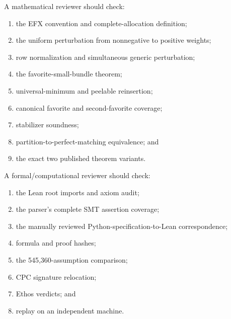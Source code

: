 \documentclass[11pt]{article}
\theoremstyle{definition}
\begin{document}
A mathematical reviewer should check:
\begin{enumerate}[leftmargin=2.1em]
  \item the EFX convention and complete-allocation definition;
  \item the uniform perturbation from nonnegative to positive weights;
  \item row normalization and simultaneous generic perturbation;
  \item the favorite-small-bundle theorem;
  \item universal-minimum and peelable reinsertion;
  \item canonical favorite and second-favorite coverage;
  \item stabilizer soundness;
  \item partition-to-perfect-matching equivalence; and
  \item the exact two published theorem variants.
\end{enumerate}

A formal/computational reviewer should check:
\begin{enumerate}[leftmargin=2.1em]
  \item the Lean root imports and axiom audit;
  \item the parser's complete SMT assertion coverage;
  \item the manually reviewed Python-specification-to-Lean correspondence;
  \item formula and proof hashes;
  \item the 545,360-assumption comparison;
  \item CPC signature relocation;
  \item Ethos verdicts; and
  \item replay on an independent machine.
\end{enumerate}
\end{document}
